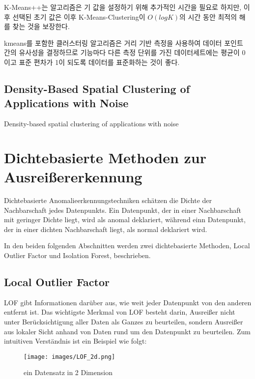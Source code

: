                 K-Means++는 알고리즘은 기 값을 설정하기 위해 추가적인 시간을 필요로 하지만, 이후 선택된 초기 값은 이후 K-Means-Clustering이 $O(log K)$의 시간 동안 최적의 해를 찾는 것을 보장한다.
                
                

                kmeans를 포함한 클러스터링 알고리즘은 거리 기반 측정을 사용하여 데이터 포인트 간의 유사성을 결정하므로 기능마다 다른 측정 단위를 가진 데이터세트에는 평균이 0이고 표준 편차가 1이 되도록 데이터를 표준화하는 것이 좋다.
                
            \subsection{Density-Based Spatial Clustering of Applications with Noise}
                Density-based spatial clustering of applications with noise
                
        \section{Dichtebasierte Methoden zur Ausreißererkennung}
            Dichtebasierte Anomalieerkennungstechniken schätzen die Dichte der Nachbarschaft jedes Datenpunkts. Ein Datenpunkt, der in einer Nachbarschaft mit geringer Dichte liegt, wird als anomal deklariert, während einn Datenpunkt, der in einer dichten Nachbarschaft liegt, als normal deklariert wird.
            
            In den beiden folgenden Abschnitten werden zwei dichtebasierte Methoden, Local Outlier Factor und Isolation Forest, beschrieben.

            \subsection{Local Outlier Factor}
                LOF gibt Informationen darüber aus, wie weit jeder Datenpunkt von den anderen entfernt ist. Das wichtigste Merkmal von LOF besteht darin, Ausreißer nicht unter Berücksichtigung aller Daten als Ganzes zu beurteilen, sondern Ausreißer aus lokaler Sicht anhand von Daten rund um den Datenpunkt zu beurteilen. Zum intuitiven Verständnis ist ein Beispiel wie folgt:

                \begin{figure}[h] %
                    \centering \texttt{[image: images/LOF\_2d.png]}
                    \caption{ein Datensatz in 2 Dimension \cite{Breunig00}}
                    \label{fig:LOF_2d}
                \end{figure}

